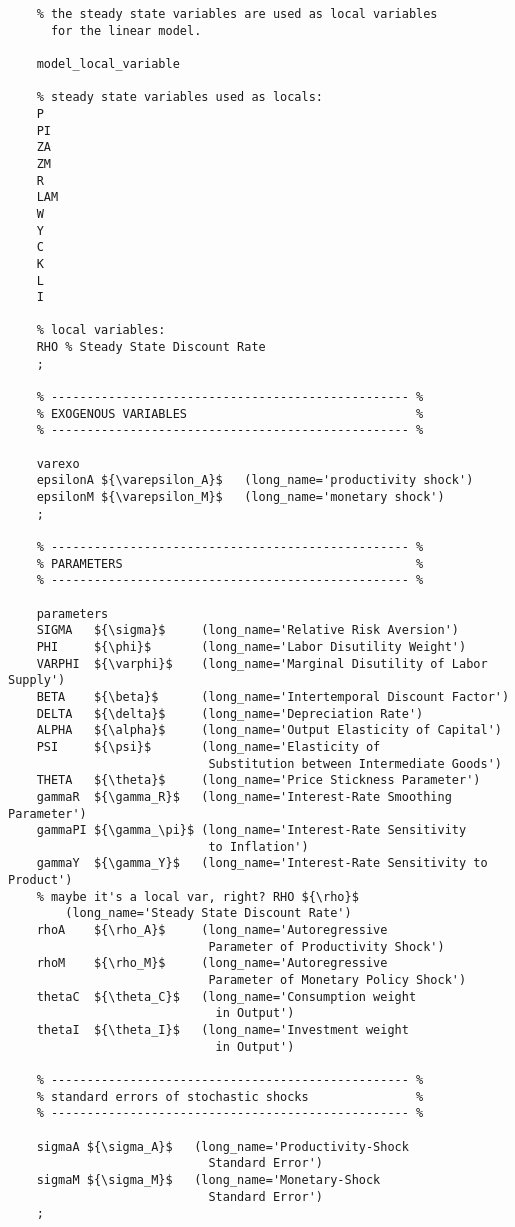 \documentclass[
	12pt,
	]{article}
\numberwithin{equation}{section}
\theoremstyle{definition}
\theoremstyle{plain}
\theoremstyle{plain}
\theoremstyle{plain}
\begin{document}
\begin{verbatim}
	% the steady state variables are used as local variables
	  for the linear model.
	
	model_local_variable
	
	% steady state variables used as locals:
	P
	PI
	ZA
	ZM
	R
	LAM
	W
	Y
	C
	K
	L
	I
	
	% local variables:
	RHO % Steady State Discount Rate
	;
	
	% -------------------------------------------------- %
	% EXOGENOUS VARIABLES                                %
	% -------------------------------------------------- %
	
	varexo
	epsilonA ${\varepsilon_A}$   (long_name='productivity shock')
	epsilonM ${\varepsilon_M}$   (long_name='monetary shock')
	;
	
	% -------------------------------------------------- %
	% PARAMETERS                                         %
	% -------------------------------------------------- %
	
	parameters
	SIGMA   ${\sigma}$     (long_name='Relative Risk Aversion')
	PHI     ${\phi}$       (long_name='Labor Disutility Weight')  
	VARPHI  ${\varphi}$    (long_name='Marginal Disutility of Labor Supply')
	BETA    ${\beta}$      (long_name='Intertemporal Discount Factor')
	DELTA   ${\delta}$     (long_name='Depreciation Rate')
	ALPHA   ${\alpha}$     (long_name='Output Elasticity of Capital')
	PSI     ${\psi}$       (long_name='Elasticity of 
	                        Substitution between Intermediate Goods')
	THETA   ${\theta}$     (long_name='Price Stickness Parameter')
	gammaR  ${\gamma_R}$   (long_name='Interest-Rate Smoothing Parameter')
	gammaPI ${\gamma_\pi}$ (long_name='Interest-Rate Sensitivity 
							to Inflation')
	gammaY  ${\gamma_Y}$   (long_name='Interest-Rate Sensitivity to Product')
	% maybe it's a local var, right? RHO ${\rho}$ 
		(long_name='Steady State Discount Rate')
	rhoA    ${\rho_A}$     (long_name='Autoregressive 
	                        Parameter of Productivity Shock')
	rhoM    ${\rho_M}$     (long_name='Autoregressive 
	                        Parameter of Monetary Policy Shock')
	thetaC  ${\theta_C}$   (long_name='Consumption weight 
	                         in Output')
	thetaI  ${\theta_I}$   (long_name='Investment weight 
	                         in Output')
	
	% -------------------------------------------------- % 
	% standard errors of stochastic shocks               %
	% -------------------------------------------------- %
	
	sigmaA ${\sigma_A}$   (long_name='Productivity-Shock 
	                        Standard Error')
	sigmaM ${\sigma_M}$   (long_name='Monetary-Shock 
	                        Standard Error')
	;
	

\end{verbatim}
\end{document}
